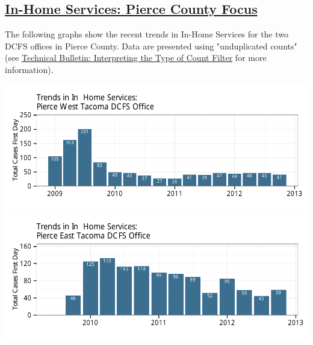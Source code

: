 \documentclass{article}\usepackage{graphicx, color}
\makeatletter
\def\maxwidth{ %
  \ifdim\Gin@nat@width>\linewidth
    \linewidth
  \else
    \Gin@nat@width
  \fi
}
\newenvironment{knitrout}{}{} %
\makeatother
\begin{document}
\subsection{\href{http://www.partnersforourchildren.org/child-well-being/visualizations/home-services/trends}
    {In-Home Services: Pierce County Focus}
}
The following graphs show the recent trends in In-Home Services for the two DCFS offices in
Pierce County.
Data are presented using "unduplicated counts" (see \href{http://http://www.partnersforourchildren.org/publications/using-different-count-types-data-portal}{Technical Bulletin: Interpreting the Type of Count Filter} for more information). 
\nopagebreak[3]
\begin{knitrout}
\color{fgcolor}

{\centering \includegraphics[width=\maxwidth]{figure/ihs_focus1} 
\includegraphics[width=\maxwidth]{figure/ihs_focus2} 

}



\end{knitrout}
\end{document}
